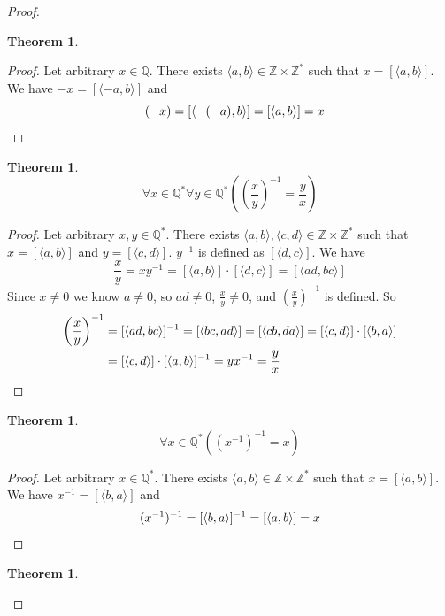\documentclass{report}
\newtheorem{theorem}[theo]{Theorem}
\begin{document}
\begin{proof}
\begin{theorem}
\end{theorem}
\begin{proof}
Let arbitrary $x\in\mathbb Q$. There exists $\langle a,b\rangle\in\mathbb Z\times\mathbb Z^*$ such that $x=[\langle a,b\rangle]$. 
We have $-x=[\langle-a,b\rangle]$ and 
\begin{equation*}
-(-x)=[\langle-(-a),b\rangle]=[\langle a,b\rangle]=x\qedhere
\end{equation*}
\end{proof}
\begin{theorem}
\begin{equation*}
\forall x\in\mathbb Q^*\forall y\in\mathbb Q^*\left(\left(\frac xy\right)^{-1}=\frac yx\right)
\end{equation*}
\end{theorem}
\begin{proof}
Let arbitrary $x,y\in\mathbb Q^*$. There exists $\langle a,b\rangle,\langle c,d\rangle\in\mathbb Z\times\mathbb Z^*$ such that 
$x=[\langle a,b\rangle]$ and $y=[\langle c,d\rangle]$. $y^{-1}$ is defined as $[\langle d,c\rangle]$. We have
\begin{equation*}
\frac{x}{y}=xy^{-1}=[\langle a,b\rangle]\cdot[\langle d,c\rangle]=[\langle ad,bc\rangle]
\end{equation*}
Since $x\neq0$ we know $a\neq0$, so $ad\neq0$, $\frac xy\neq0$, and $\left(\frac xy\right)^{-1}$ is defined. So
\begin{align*}
\left(\frac xy\right)^{-1}&=[\langle ad,bc\rangle]^{-1}=[\langle bc,ad\rangle]=[\langle cb,da\rangle]
=[\langle c,d\rangle]\cdot[\langle b,a\rangle]\\
&=[\langle c,d\rangle]\cdot[\langle a,b\rangle]^{-1}=yx^{-1}=\frac yx\qedhere
\end{align*}
\end{proof}
\begin{theorem}
\begin{equation*}
\forall x\in\mathbb Q^*((x^{-1})^{-1}=x)
\end{equation*}
\end{theorem}
\begin{proof}
Let arbitrary $x\in\mathbb Q^*$. There exists $\langle a,b\rangle\in\mathbb Z\times\mathbb Z^*$ such that $x=[\langle a,b\rangle]$.
We have $x^{-1}=[\langle b,a\rangle]$ and 
\begin{equation*}
(x^{-1})^{-1}=[\langle b,a\rangle]^{-1}=[\langle a,b\rangle]=x\qedhere
\end{equation*}
\end{proof}
\begin{theorem}

\end{theorem}
\end{proof}
\end{document}

